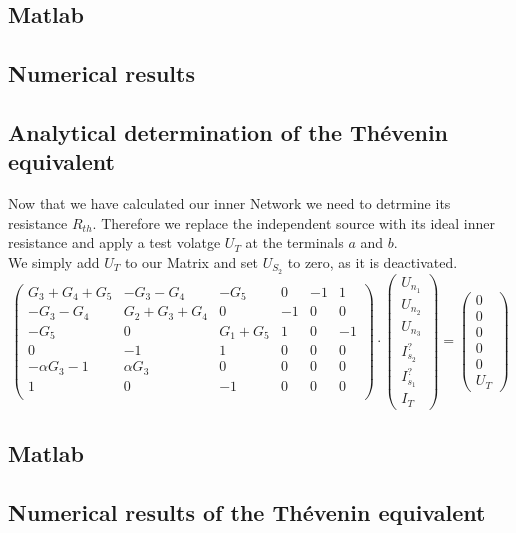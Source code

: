 \documentclass[a4paper]{article}
\begin{document}
\subsection{Matlab}
\subsection{Numerical results}
\newpage
\subsection{Analytical determination of the Thévenin equivalent}
Now that we have calculated our inner Network we need to detrmine its resistance $R_{th}$.
Therefore we replace the independent source with its ideal inner resistance and apply a test
volatge $U_T$ at the terminals $a$ and $b$.\\
We simply add $U_T$ to our Matrix and set $U_{S_2}$ to zero, as it is deactivated.
\begin{equation}
      \begin{pmatrix}
            G_3 + G_4 + G_5 & -G_3 - G_4 & -G_5 & 0 & -1 &1\\
            -G_3 -G_4 & G_2 + G_3 + G_4 & 0 & -1 & 0 &0\\
            -G_5 & 0 & G_1 + G_5 & 1 & 0 &-1\\
            0 & -1 & 1 & 0 & 0 &0\\
            -\alpha G_3-1 & \alpha G_3 & 0 & 0 & 0 &0\\
            1 & 0 & -1 & 0 & 0 & 0\\
      \end{pmatrix}
      \cdot
      \begin{pmatrix}
            U_{n_1}\\U_{n_2}\\U_{n_3}\\I_{s_2}^?\\I_{s_1}^?\\I_T
      \end{pmatrix}
      =
      \begin{pmatrix}
            0\\0\\0\\0\\0\\U_T
      \end{pmatrix}
\end{equation}
\subsection{Matlab}
\subsection{Numerical results of the Thévenin equivalent}
\end{document}
